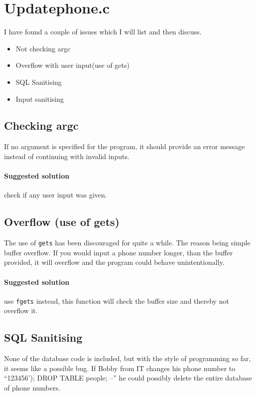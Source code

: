 \section{Updatephone.c}
I have found a couple of issues which I will list and then discuss.

\begin{itemize}
\item Not checking argc
\item Overflow with user input(use of gets)
\item SQL Sanitising
\item Input sanitising
\end{itemize}

\subsection{Checking argc}
If no argument is specified for the program, it should provide an error message
instead of continuing with invalid inputs.

\paragraph{Suggested solution} check if any user input was given.

\subsection{Overflow (use of gets)}
The use of \texttt{gets} has been discouraged for quite a while. The reason
being simple buffer overflow. If you would input a phone number longer, than
the buffer provided, it will overflow and the program could behave
unintentionally.

\paragraph{Suggested solution} use \texttt{fgets} instead, this function will
check the buffer size and thereby not overflow it.

\subsection{SQL Sanitising}
None of the database code is included, but with the style of programming so
far, it seems like a possible bug. If Bobby from IT changes his phone number to
``123456'); DROP TABLE people; --'' he could possibly delete the entire
database of phone numbers.

